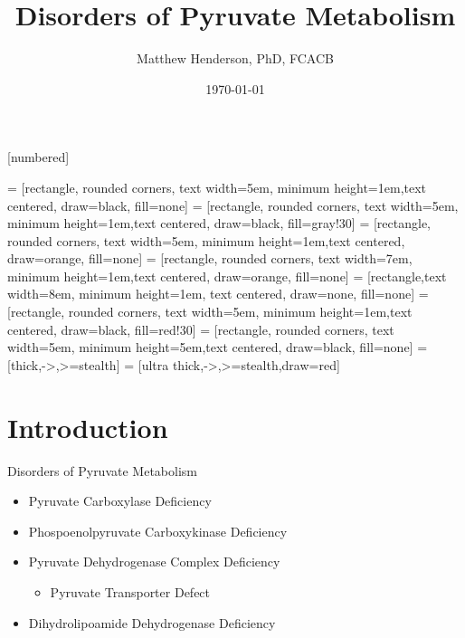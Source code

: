\documentclass[presentation, smaller]{beamer}
\author{Matthew Henderson, PhD, FCACB}
\date{\today}
\title{Disorders of Pyruvate Metabolism}
\institute[NSO]{Newborn Screening Ontario | The University of Ottawa}
\begin{document}
\maketitle


\vspace{220pt}
\beamertemplatenavigationsymbolsempty
{}[numbered]

 = [rectangle, rounded corners, text width=5em, minimum height=1em,text centered, draw=black, fill=none]
 = [rectangle, rounded corners, text width=5em, minimum height=1em,text centered, draw=black, fill=gray!30]
 = [rectangle, rounded corners, text width=5em, minimum height=1em,text centered, draw=orange, fill=none]
 = [rectangle, rounded corners, text width=7em, minimum height=1em,text centered, draw=orange, fill=none]
 = [rectangle,text width=8em, minimum height=1em, text centered, draw=none, fill=none]
 = [rectangle, rounded corners, text width=5em, minimum height=1em,text centered, draw=black, fill=red!30]
 = [rectangle, rounded corners, text width=5em, minimum height=5em,text centered, draw=black, fill=none]
 = [thick,->,>=stealth]
 = [ultra thick,->,>=stealth,draw=red]

\section{Introduction}
\label{sec:orgc3432d4}
\begin{frame}[label={sec:org10ec973}]{Disorders of Pyruvate Metabolism}
\begin{itemize}
\item Pyruvate Carboxylase Deficiency
\item Phospoenolpyruvate Carboxykinase Deficiency
\item Pyruvate Dehydrogenase Complex Deficiency
\begin{itemize}
\item Pyruvate Transporter Defect
\end{itemize}
\item Dihydrolipoamide Dehydrogenase Deficiency
\end{itemize}
\end{frame}
\end{document}

